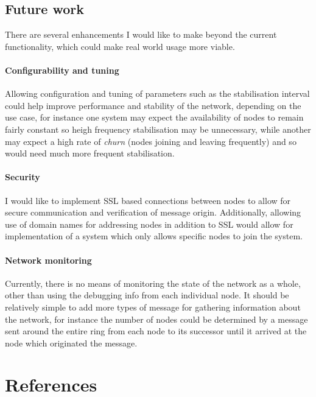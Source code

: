 \documentclass{article}
\begin{document}

\subsection{Future work}

There are several enhancements I would like to make beyond the current functionality, which could make real world usage more viable.
\paragraph{Configurability and tuning} Allowing configuration and tuning of parameters such as the stabilisation interval could help improve performance and stability of the network, depending on the use case, for instance one system may expect the availability of nodes to remain fairly constant so heigh frequency stabilisation may be unnecessary, while another may expect a high rate of \textit{churn} (nodes joining and leaving frequently) and so would need much more frequent stabilisation.

\paragraph{Security} I would like to implement SSL based connections between nodes to allow for secure communication and verification of message origin.
Additionally, allowing use of domain names for addressing nodes in addition to SSL would allow for implementation of a system which only allows specific nodes to join the system.

\paragraph{Network monitoring} Currently, there is no means of monitoring the state of the network as a whole, other than using the debugging info from each individual node. It should be relatively simple to add more types of message for gathering information about the network, for instance the number of nodes could be determined by a message sent around the entire ring from each node to its successor until it arrived at the node which originated the message.

\section{References}

%
%
\printbibliography
\end{document}
